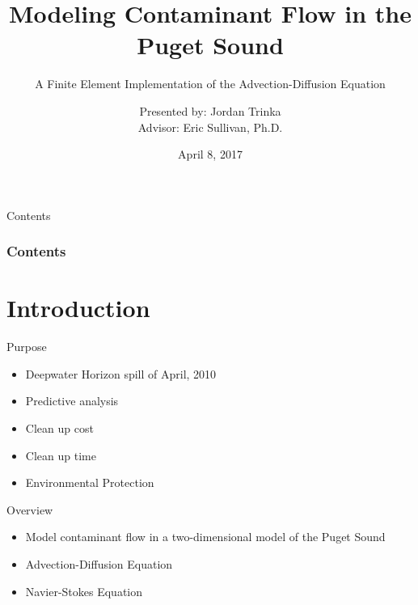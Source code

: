 \documentclass[10pt]{beamer}
\author{Presented by: Jordan Trinka\\ Advisor: Eric Sullivan, Ph.D.}
\title[Short Title]{ Modeling Contaminant Flow in the \\Puget Sound}
\subtitle{A Finite Element Implementation of the Advection-Diffusion Equation} %
\date{April 8, 2017} %
\begin{document}
\begin{frame}[t,plain]
    \titlepage
\end{frame}

\begin{frame}{Contents}
\frametitle{Contents}
    \tableofcontents[
]
\end{frame}

\section{Introduction}

\begin{frame}{Purpose} \label{Purpose}
\begin{itemize}
\item Deepwater Horizon spill of April, 2010
\item Predictive analysis
\item Clean up cost
\item Clean up time
\item Environmental Protection
\end{itemize}

\hyperlink{Questions}{}
\end{frame}

\begin{frame}{Overview}\label{Overview}

\begin{itemize}
\item Model contaminant flow in a two-dimensional model of the Puget Sound
\item Advection-Diffusion Equation
\item Navier-Stokes Equation
\end{itemize}

\end{frame}
\end{document}

